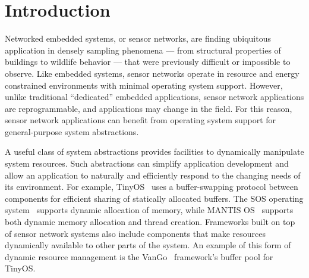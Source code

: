 \section{Introduction}
\label{sec:intro}

Networked embedded systems, or sensor networks, are finding ubiquitous
application in densely sampling phenomena --- from structural
properties of buildings to wildlife behavior --- that were previously
difficult or impossible to observe.  Like embedded systems, sensor
networks operate in resource and energy constrained environments with
minimal operating system support.  However, unlike traditional
``dedicated'' embedded applications, sensor network applications are
reprogrammable, and applications may change in the field.  For this
reason, sensor network applications can benefit from operating system
support for general-purpose system abstractions.

A useful class of system abstractions provides facilities to
dynamically manipulate system resources.  
%
%
Such abstractions can simplify application development and allow an
application to naturally and efficiently respond to the changing needs of its
environment.  
%
%
For example, TinyOS~\cite{TinyOS} uses a buffer-swapping protocol 
between components for
efficient sharing of statically allocated buffers.  
The SOS operating system~\cite{sos} supports dynamic
allocation of memory, while MANTIS OS~\cite{abrach03mantis} supports
both dynamic memory allocation and thread creation.
Frameworks built on
top of sensor network systems also include components that make
resources dynamically available to other parts of the system.  
An example of this form of dynamic resource 
management is the
VanGo~\cite{greenstein05vango} framework's buffer pool for
TinyOS. 

%
%


